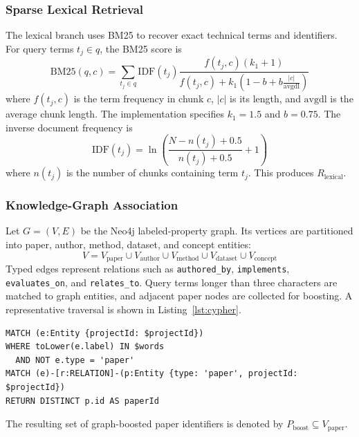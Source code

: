 \documentclass[conference]{IEEEtran}
\begin{document}
\subsubsection{Sparse Lexical Retrieval}
The lexical branch uses BM25 to recover exact technical terms and identifiers. For query terms $t_j \in q$, the BM25 score is
\begin{equation}
\mathrm{BM25}(q, c) = \sum_{t_j \in q} \mathrm{IDF}(t_j) \frac{f(t_j, c)(k_1 + 1)}{f(t_j, c) + k_1\left(1 - b + b\frac{|c|}{\mathrm{avgdl}}\right)}
\label{eq:bm25}
\end{equation}
where $f(t_j, c)$ is the term frequency in chunk $c$, $|c|$ is its length, and $\mathrm{avgdl}$ is the average chunk length. The implementation specifies $k_1 = 1.5$ and $b = 0.75$. The inverse document frequency is
\begin{equation}
\mathrm{IDF}(t_j) = \ln\left(\frac{N - n(t_j) + 0.5}{n(t_j) + 0.5} + 1\right)
\label{eq:idf}
\end{equation}
where $n(t_j)$ is the number of chunks containing term $t_j$. This produces $R_{\mathrm{lexical}}$.

\subsubsection{Knowledge-Graph Association}
Let $G = (V, E)$ be the Neo4j labeled-property graph. Its vertices are partitioned into paper, author, method, dataset, and concept entities:
\begin{equation}
V = V_{\mathrm{paper}} \cup V_{\mathrm{author}} \cup V_{\mathrm{method}} \cup V_{\mathrm{dataset}} \cup V_{\mathrm{concept}}
\label{eq:vertices}
\end{equation}
Typed edges represent relations such as \texttt{authored\_by}, \texttt{implements}, \texttt{evaluates\_on}, and \texttt{relates\_to}. Query terms longer than three characters are matched to graph entities, and adjacent paper nodes are collected for boosting. A representative traversal is shown in Listing~\ref{lst:cypher}.

\begin{lstlisting}[language={},caption={Representative Neo4j Cypher traversal.},label={lst:cypher}]
MATCH (e:Entity {projectId: $projectId})
WHERE toLower(e.label) IN $words
  AND NOT e.type = 'paper'
MATCH (e)-[r:RELATION]-(p:Entity {type: 'paper', projectId: $projectId})
RETURN DISTINCT p.id AS paperId
\end{lstlisting}

The resulting set of graph-boosted paper identifiers is denoted by $P_{\mathrm{boost}} \subseteq V_{\mathrm{paper}}$.
\end{document}

